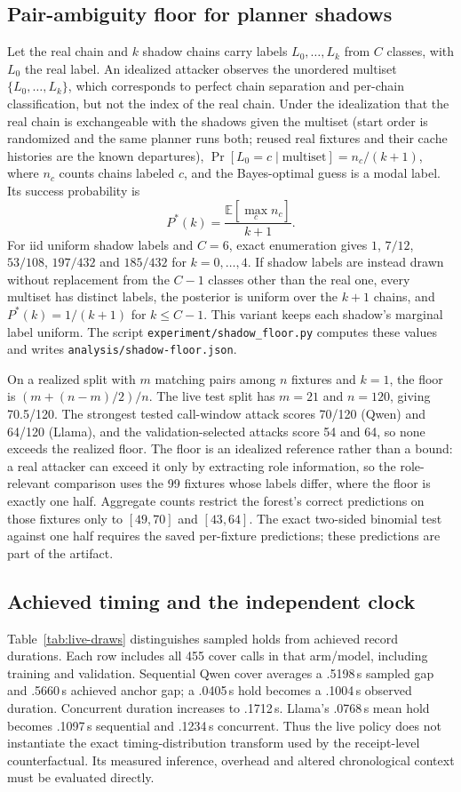 \subsection{Pair-ambiguity floor for planner shadows}\label{sec:supp-floor}
Let the real chain and $k$ shadow chains carry labels $L_0,\dots,L_k$ from $C$ classes, with $L_0$ the real label. An idealized attacker observes the unordered multiset $\{L_0,\dots,L_k\}$, which corresponds to perfect chain separation and per-chain classification, but not the index of the real chain. Under the idealization that the real chain is exchangeable with the shadows given the multiset (start order is randomized and the same planner runs both; reused real fixtures and their cache histories are the known departures), $\Pr[L_0=c\mid\text{multiset}]=n_c/(k+1)$, where $n_c$ counts chains labeled $c$, and the Bayes-optimal guess is a modal label. Its success probability is
\[P^*(k)=\frac{\mathbb{E}[\max_c n_c]}{k+1}.\]
For iid uniform shadow labels and $C=6$, exact enumeration gives $1$, $7/12$, $53/108$, $197/432$ and $185/432$ for $k=0,\dots,4$. If shadow labels are instead drawn without replacement from the $C-1$ classes other than the real one, every multiset has distinct labels, the posterior is uniform over the $k+1$ chains, and $P^*(k)=1/(k+1)$ for $k\le C-1$. This variant keeps each shadow's marginal label uniform. The script \texttt{experiment/shadow\_floor.py} computes these values and writes \texttt{analysis/shadow-floor.json}.

On a realized split with $m$ matching pairs among $n$ fixtures and $k=1$, the floor is $(m+(n-m)/2)/n$. The live test split has $m=21$ and $n=120$, giving 70.5/120. The strongest tested call-window attack scores 70/120 (Qwen) and 64/120 (Llama), and the validation-selected attacks score 54 and 64, so none exceeds the realized floor. The floor is an idealized reference rather than a bound: a real attacker can exceed it only by extracting role information, so the role-relevant comparison uses the 99 fixtures whose labels differ, where the floor is exactly one half. Aggregate counts restrict the forest's correct predictions on those fixtures only to $[49,70]$ and $[43,64]$. The exact two-sided binomial test against one half requires the saved per-fixture predictions; these predictions are part of the artifact.

\subsection{Achieved timing and the independent clock}
Table~\ref{tab:live-draws} distinguishes sampled holds from achieved record durations. Each row includes all 455 cover calls in that arm/model, including training and validation. Sequential Qwen cover averages a .5198\,s sampled gap and .5660\,s achieved anchor gap; a .0405\,s hold becomes a .1004\,s observed duration. Concurrent duration increases to .1712\,s. Llama's .0768\,s mean hold becomes .1097\,s sequential and .1234\,s concurrent. Thus the live policy does not instantiate the exact timing-distribution transform used by the receipt-level counterfactual. Its measured inference, overhead and altered chronological context must be evaluated directly.

